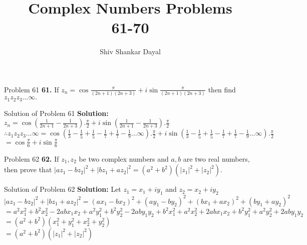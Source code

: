 \documentclass[aspectratio=169,8pt]{beamer}
\title{Complex Numbers Problems\\ 61-70}
\author[Shiv Shankar Dayal]{Shiv Shankar Dayal}
\begin{document}
\begin{frame}
  \titlepage
\end{frame}
\begin{frame}{Problem 61}
  \textbf{61.} If $z_n = \cos\frac{\pi}{(2n + 1)(2n + 3)} + i\sin\frac{\pi}{(2n + 1)(2n + 3)}$ then find $z_1z_2z_3\ldots\infty.$
\end{frame}
\begin{frame}{Solution of Problem 61}
  \textbf{Solution:} $z_n = \cos\left(\frac{1}{2n + 1} - \frac{1}{2n + 3}\right).\frac{\pi}{2} + i\sin\left(\frac{1}{2n + 1} - \frac{1}{2n + 3}\right).\frac{\pi}{2}$\\
  \vspace*{0.2cm}
  $\therefore z_1z_2z_3\ldots\infty = \cos\left(\frac{1}{3} - \frac{1}{5} + \frac{1}{5} - \frac{1}{7} + \frac{1}{7} - \frac{1}{9}\ldots\infty\right).\frac{\pi}{2} + i\sin\left(\frac{1}{3} - \frac{1}{5} + \frac{1}{5} - \frac{1}{7} + \frac{1}{7} - \frac{1}{9}\ldots\infty\right).\frac{\pi}{2}$\\
  \vspace*{0.2cm}
  $= \cos\frac{\pi}{6} + i\sin\frac{\pi}{6}$
\end{frame}
\begin{frame}{Problem 62}
  \textbf{62.} If $z_1, z_2$ be two complex numbers and $a,b$ are two real numbers, then prove that $|az_1 - bz_2|^2 + |bz_1 + az_2|^2 = (a^2 + b^2)(|z_1|^2 + |z_2|^2).$
\end{frame}
\begin{frame}{Solution of Problem 62}
  \textbf{Solution:} Let $z_1 = x_1 + iy_1$ and $z_2 = x_2 + iy_2$\\
  \vspace*{0.2cm}
  $|az_1 - bz_2|^2 + |bz_1 + az_2|^2 = (ax_1 - bx_2)^2 + (ay_1 - by_2)^2 + (bx_1 + ax_2)^2 + (by_1 + ay_2)^2$\\
  \vspace*{0.2cm}
  $= a^2x_1^2 + b^2x_2^2 -2abx_1x_2 + a^2y_1^2 + b^2y_2^2 - 2aby_1y_2 + b^2x_1^2 + a^2x_2^2 + 2abx_1x_2 + b^2y_1^2 + a^2y_2^2 + 2aby_1y_2$\\
  \vspace*{0.2cm}
  $= (a^2 + b^2)(x_1^2 + y_1^2 + x_2^2 + y_2^2)$\\
  \vspace*{0.2cm}
  $= (a^2 + b^2)(|z_1|^2 + |z_2|^2)$
\end{frame}
\end{document}
